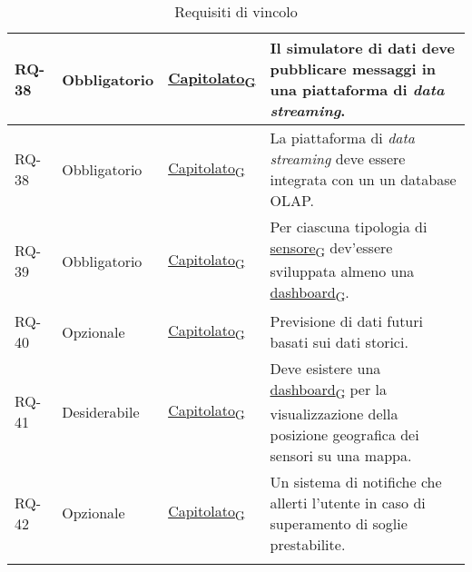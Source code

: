 \begin{longtable}{|>{\centering\arraybackslash}m{}|>{\centering\arraybackslash}m{}|>{\centering\arraybackslash}m{}|>{\centering\arraybackslash}m{}|}
	RQ-38           & Obbligatorio        & \href{https://7last.github.io/docs/rtb/documentazione-interna/glossario\#capitolato}{Capitolato\textsubscript{G}} & Il simulatore di dati deve pubblicare messaggi in una piattaforma di \textit{data streaming}.                                                                                                                                                                                           \\\hline
	RQ-38           & Obbligatorio        & \href{https://7last.github.io/docs/rtb/documentazione-interna/glossario\#capitolato}{Capitolato\textsubscript{G}} & La piattaforma di \textit{data streaming} deve essere integrata con un un database OLAP.                                                                                                                                                                                                \\\hline
	RQ-39           & Obbligatorio        & \href{https://7last.github.io/docs/rtb/documentazione-interna/glossario\#capitolato}{Capitolato\textsubscript{G}} & Per ciascuna tipologia di \href{https://7last.github.io/docs/rtb/documentazione-interna/glossario\#sensore}{sensore\textsubscript{G}} dev'essere sviluppata almeno una \href{https://7last.github.io/docs/rtb/documentazione-interna/glossario\#dashboard}{dashboard\textsubscript{G}}. \\\hline
	RQ-40           & Opzionale           & \href{https://7last.github.io/docs/rtb/documentazione-interna/glossario\#capitolato}{Capitolato\textsubscript{G}} & Previsione di dati futuri basati sui dati storici.                                                                                                                                                                                                                                      \\\hline
	RQ-41           & Desiderabile        & \href{https://7last.github.io/docs/rtb/documentazione-interna/glossario\#capitolato}{Capitolato\textsubscript{G}} & Deve esistere una \href{https://7last.github.io/docs/rtb/documentazione-interna/glossario\#dashboard}{dashboard\textsubscript{G}} per la visualizzazione della posizione geografica dei sensori su una mappa.                                                                           \\\hline
	RQ-42           & Opzionale           & \href{https://7last.github.io/docs/rtb/documentazione-interna/glossario\#capitolato}{Capitolato\textsubscript{G}} & Un sistema di notifiche che allerti l'utente in caso di superamento di soglie prestabilite.                                                                                                                                                                                             \\\hline
	\caption{Requisiti di vincolo}
	\label{table:3}
\end{longtable}


